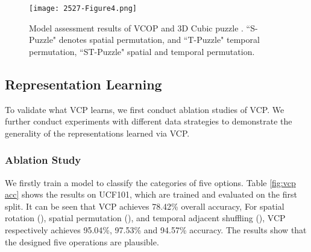 \documentclass[letterpaper]{article}
\begin{document}
\begin{table}
\caption{Accuracy of operation classification. ``'' denotes original video clips, ``''  the spatial rotation, ``'' the spatial permutation , ``'' the temporal remote shuffling, and ``'' the temporal adjacent shuffling .}
    \label{fig:vcp acc}
\end{table}

\begin{figure*}
     \centering
     \texttt{[image: 2527-Figure4.png]}
     \caption{Model assessment results of VCOP \cite{xu2019self} and 3D Cubic puzzle \cite{kim2019self}. ``S-Puzzle" denotes spatial permutation, and  ``T-Puzzle" temporal permutation, ``ST-Puzzle" spatial and temporal permutation.}
     \label{fig:Video assessment}
 \end{figure*}
 
\subsection{Representation Learning}
To validate what VCP learns, we first conduct ablation studies of VCP. We further conduct experiments with different data strategies to demonstrate the generality of the representations learned via VCP.

\subsubsection{Ablation Study}
We firstly train a model to classify the categories of five options. Table \ref{fig:vcp acc} shows the results on UCF101, which are trained and  evaluated on the first split. It can be seen that VCP achieves 78.42\% overall accuracy, For spatial rotation (), spatial permutation (), and temporal adjacent shuffling (), VCP respectively achieves 95.04\%, 97.53\% and 94.57\% accuracy. The results show that the designed five operations are plausible.
\end{document}
